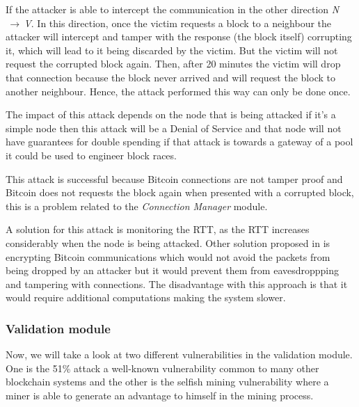 If the attacker is able to intercept the communication in the other direction \textit{N$\,\to\,$V}. In this direction, once the victim requests a block to a neighbour the attacker will intercept and tamper with the response (the block itself) corrupting it, which will lead to it being discarded by the victim. But the victim will not request the corrupted block again. Then, after 20 minutes the victim will drop that connection because the block never arrived and will request the block to another neighbour. Hence, the attack performed this way can only be done once.

The impact of this attack depends on the node that is being attacked if it's a simple node then this attack will be a Denial of Service and that node will not have guarantees for double spending if that attack is towards a gateway of a pool it could be used to engineer block races.

This attack is successful because Bitcoin connections are not tamper proof and Bitcoin does not requests the block again when presented with a corrupted block, this is a problem related to the \textit{Connection Manager} module.

A solution for this attack is monitoring the RTT, as the RTT increases considerably when the node is being attacked. Other solution proposed in \cite{apostolaki2016hijacking} is encrypting Bitcoin communications which would not avoid the packets from being dropped by an attacker but it would prevent them from eavesdroppping and tampering with connections. The disadvantage with this approach is that it would require additional computations making the system slower.



\subsubsection{Validation module}
\label{sec:validation_module}
Now, we will take a look at two different vulnerabilities in the validation module. One is the 51\% attack a well-known vulnerability common to many other blockchain systems and the other is the selfish mining vulnerability where a miner is able to generate an advantage to himself in the mining process.

